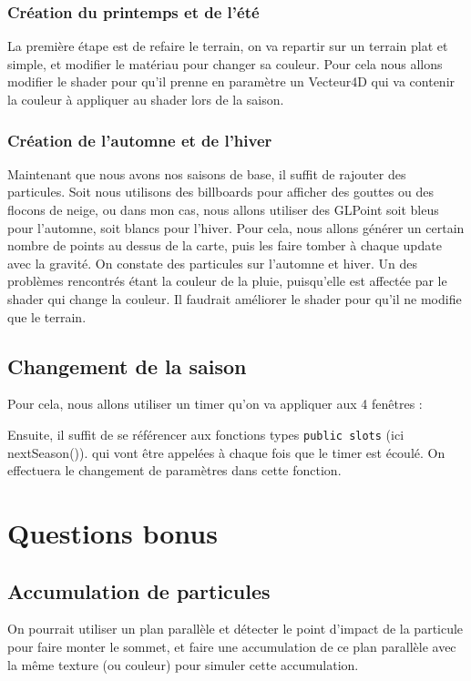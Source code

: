 \documentclass[a4paper,11pt]{report}
\begin{document}
	\subsubsection{Création du printemps et de l'été}
	La première étape est de refaire le terrain, on va repartir sur un terrain plat et simple, et modifier le matériau pour changer sa couleur. Pour cela nous allons modifier le shader pour qu'il prenne en paramètre un Vecteur4D qui va contenir la couleur à appliquer au shader lors de la saison.
	
	
	\pagebreak
	\subsubsection{Création de l'automne et de l'hiver}
	Maintenant que nous avons nos saisons de base, il suffit de rajouter des particules. Soit nous utilisons des billboards pour afficher des gouttes ou des flocons de neige, ou dans mon cas, nous allons utiliser des GLPoint soit bleus pour l'automne, soit blancs pour l'hiver.
	Pour cela, nous allons générer un certain nombre de points au dessus de la carte, puis les faire tomber à chaque update avec la gravité.
	On constate des particules sur l'automne et hiver. Un des problèmes rencontrés étant la couleur de la pluie, puisqu'elle est affectée par le shader qui change la couleur. Il faudrait améliorer le shader pour qu'il ne modifie que le terrain.
	
	\pagebreak
	\subsection{Changement de la saison}
	Pour cela, nous allons utiliser un timer qu'on va appliquer aux 4 fenêtres :
	
	Ensuite, il suffit de se référencer aux fonctions types \texttt{public slots} (ici nextSeason()). qui vont être appelées à chaque fois que le timer est écoulé. On effectuera le changement de paramètres dans cette fonction.
	
	\pagebreak
	\section{Questions bonus}
	\subsection{Accumulation de particules}
	On pourrait utiliser un plan parallèle et détecter le point d'impact de la particule pour faire monter le sommet, et faire une accumulation de ce plan parallèle avec la même texture (ou couleur) pour simuler cette accumulation.
	
\end{document}
